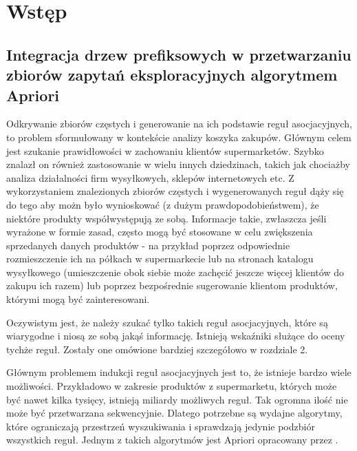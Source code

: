 \chapter{Wstęp}
\label{c1}

\section{Integracja drzew prefiksowych w przetwarzaniu zbiorów zapytań eksploracyjnych algorytmem Apriori}
\label{c11}


Odkrywanie zbiorów częstych i generowanie na ich podstawie reguł asocjacyjnych, to problem sformułowany w kontekście analizy koszyka zakupów. Głównym celem jest szukanie prawidłowości w zachowaniu klientów supermarketów. Szybko znalazł on również zastosowanie w wielu innych dziedzinach, takich jak chociażby analiza działalności firm wysyłkowych, sklepów internetowych etc. Z wykorzystaniem znalezionych zbiorów częstych i wygenerowanych reguł dąży się do tego aby możn było wynioskować (z dużym prawdopodobieństwem), że niektóre produkty współwystępują ze sobą. Informacje takie, zwłaszcza jeśli wyrażone w formie zasad, często mogą być stosowane w celu zwiększenia sprzedanych danych produktów - na przykład poprzez odpowiednie rozmieszczenie ich na półkach w supermarkecie lub na stronach katalogu wysyłkowego (umieszczenie obok siebie może zachęcić jeszcze więcej klientów do zakupu ich razem) lub poprzez bezpośrednie sugerowanie klientom produktów, którymi mogą być zainteresowani. 

Oczywistym jest, że należy szukać tylko takich reguł asocjacyjnych, które są wiarygodne i niosą ze sobą jakąś informację. Istnieją wskaźniki służące do oceny tychże reguł. Zostały one omówione bardziej szczegółowo w rozdziale 2. 

Głównym problemem indukcji reguł asocjacyjnych jest to, że istnieje bardzo wiele możliwości. Przykładowo w zakresie produktów z supermarketu, których może być nawet kilka tysięcy, istnieją miliardy możliwych reguł. Tak ogromna ilość nie może być przetwarzana sekwencyjnie. Dlatego potrzebne są wydajne algorytmy, które ograniczają przestrzeń wyszukiwania i sprawdzają jedynie podzbiór wszystkich reguł. Jednym z takich algorytmów jest Apriori opracowany przez \cite{Agrawal}.

